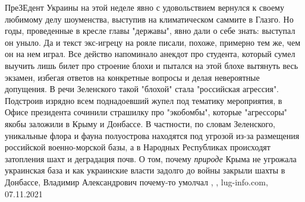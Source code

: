 ПреЗЕдент Украины на этой неделе явно с удовольствием вернулся к своему
любимому делу шоуменства, выступив на климатическом саммите в Глазго. Но годы,
проведенные в кресле главы "державы", явно дали о себе знать: выступал он
уныло.  Да и текст экс-игрецу на рояле писали, похоже, примерно тем же, чем он
на нем играл. Все действо напоминало анекдот про студента, который сумел
выучить лишь билет про строение блохи и пытался на этой блохе вытянуть весь
экзамен, избегая ответов на конкретные вопросы и делая невероятные допущения.
В речи Зеленского такой "блохой" стала "российская агрессия". Подстроив изрядно
всем поднадоевший жупел под тематику мероприятия, в Офисе президента сочинили
страшилку про "экобомбы", которые "агрессоры" якобы заложили в Крыму и
Донбассе. В частности, по словам Зеленского, уникальные флора и фауна
полуострова находятся под угрозой из-за размещения российской военно-морской
базы, а в Народных Республиках происходят затопления шахт и деградация почв. О
том, почему \emph{природе} Крыма не угрожала украинская база и как украинские
власти задолго до войны закрыли шахты в Донбассе, Владимир Александрович
почему-то умолчал
, 
, lug-info.com, 07.11.2021
